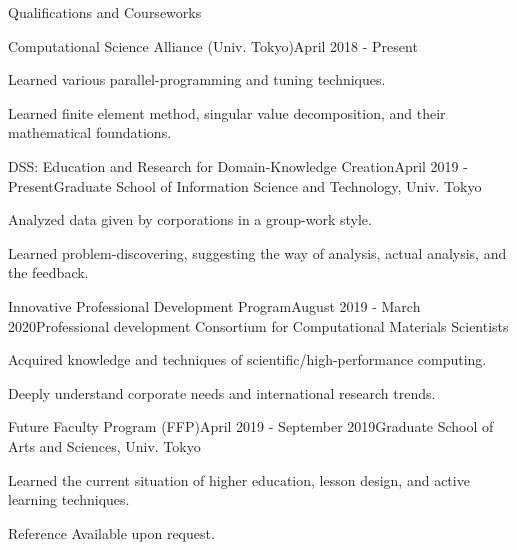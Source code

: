 \documentclass{resume} %
\begin{document}
\begin{rSection}{Qualifications and Courseworks}

\begin{rSubsection}{Computational Science Alliance (Univ. Tokyo)}{April 2018 - Present}{}{}
\item Learned various parallel-programming and tuning techniques.
\item Learned finite element method, singular value decomposition, and their mathematical foundations.
\end{rSubsection}

\begin{rSubsection}{DSS: Education and Research for Domain-Knowledge Creation}{April 2019 - Present}{Graduate School of Information Science and Technology, Univ. Tokyo}{}
\item Analyzed data given by corporations in a group-work style.
\item Learned problem-discovering, suggesting the way of analysis, actual analysis, and the feedback.
\end{rSubsection}

\begin{rSubsection}{Innovative Professional Development Program}{August 2019 - March 2020}{Professional development Consortium for Computational Materials Scientists}{}
\item Acquired knowledge and techniques of scientific/high-performance computing.
\item Deeply understand corporate needs and international research trends.
\end{rSubsection}

\begin{rSubsection}{Future Faculty Program (FFP)}{April 2019 - September 2019}{Graduate School of Arts and Sciences, Univ. Tokyo}{}
\item Learned the current situation of higher education, lesson design, and active learning techniques.
\end{rSubsection}

\end{rSection}

\begin{rSection}{Reference}{}{}{}
Available upon request.
\end{rSection}
\end{document}
